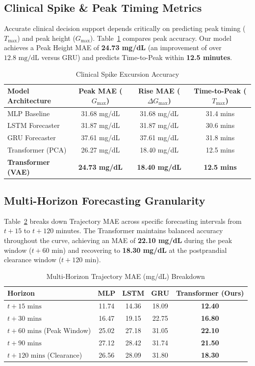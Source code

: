 \documentclass[conference]{IEEEtran}
\begin{document}
\subsection{Clinical Spike \& Peak Timing Metrics}
Accurate clinical decision support depends critically on predicting peak timing ($T_{\max}$) and peak height ($G_{\max}$). Table~\ref{tab:peak_metrics} compares peak accuracy. Our model achieves a Peak Height MAE of \textbf{24.73 mg/dL} (an improvement of over $12.8\text{ mg/dL}$ versus GRU) and predicts Time-to-Peak within \textbf{12.5 minutes}.

\begin{table}[!h]
\centering
\caption{Clinical Spike Excursion Accuracy}
\label{tab:peak_metrics}
\begin{tabular}{lccc}
\toprule
\textbf{Model Architecture} & \textbf{Peak MAE ($G_{\max}$)} & \textbf{Rise MAE ($\Delta G_{\max}$)} & \textbf{Time-to-Peak ($T_{\max}$)} \\
\midrule
MLP Baseline & 31.68 mg/dL & 31.68 mg/dL & 31.4 mins \\
LSTM Forecaster & 31.87 mg/dL & 31.87 mg/dL & 30.6 mins \\
GRU Forecaster & 37.61 mg/dL & 37.61 mg/dL & 31.8 mins \\
Transformer (PCA) & 26.27 mg/dL & 18.40 mg/dL & 12.5 mins \\
\textbf{Transformer (VAE)} & \textbf{24.73 mg/dL} & \textbf{18.40 mg/dL} & \textbf{12.5 mins} \\
\bottomrule
\end{tabular}
\end{table}

\subsection{Multi-Horizon Forecasting Granularity}
Table~\ref{tab:horizon_metrics} breaks down Trajectory MAE across specific forecasting intervals from $t+15$ to $t+120$ minutes. The Transformer maintains balanced accuracy throughout the curve, achieving an MAE of \textbf{22.10 mg/dL} during the peak window ($t+60$ min) and recovering to \textbf{18.30 mg/dL} at the postprandial clearance window ($t+120$ min).

\begin{table}[!h]
\centering
\caption{Multi-Horizon Trajectory MAE (mg/dL) Breakdown}
\label{tab:horizon_metrics}
\begin{tabular}{lcccc}
\toprule
\textbf{Horizon} & \textbf{MLP} & \textbf{LSTM} & \textbf{GRU} & \textbf{Transformer (Ours)} \\
\midrule
$t + 15\text{ mins}$ & 11.74 & 14.36 & 18.09 & \textbf{12.40} \\
$t + 30\text{ mins}$ & 16.47 & 19.15 & 22.75 & \textbf{16.80} \\
$t + 60\text{ mins}$ (Peak Window) & 25.02 & 27.18 & 31.05 & \textbf{22.10} \\
$t + 90\text{ mins}$ & 27.12 & 28.42 & 31.74 & \textbf{21.50} \\
$t + 120\text{ mins}$ (Clearance) & 26.56 & 28.09 & 31.80 & \textbf{18.30} \\
\bottomrule
\end{tabular}
\end{table}
\end{document}
